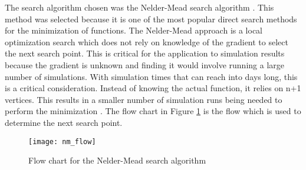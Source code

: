 \label{algrothim_description}

The search algorithm chosen was the Nelder-Mead search algorithm \cite{nelder_1965}.  This method was selected because it is one of the most popular direct search methods for the minimization of functions.  The Nelder-Mead approach is a local optimization search which does not rely on knowledge of the gradient to select the next search point.  This is critical for the application to simulation results because the gradient is unknown and finding it would involve running a large number of simulations.  With simulation times that can reach into days long, this is a critical consideration.  
Instead of knowing the actual function, it relies on n+1 vertices.  This results in a smaller number of simulation runs being needed to perform the minimization \cite{wang_2011}.
The flow chart in Figure \ref{fig:nm_flow} is the flow which is used to determine the next search point.
\begin{figure}[!htb]
	\centering
	\texttt{[image: nm\_flow]}
	\caption{Flow chart for the Nelder-Mead search algorithm\cite{nelder_1965}}
	\label{fig:nm_flow}
\end{figure}

